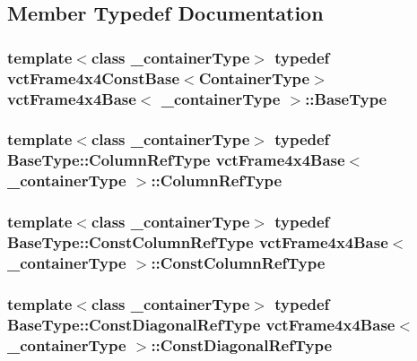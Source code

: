 \subsection{Member Typedef Documentation}
\hypertarget{classvct_frame4x4_base_afdce5a53de5e8e244a2e05b4843226bb}{
\subsubsection[{Base\-Type}]{\setlength{\rightskip}{0pt plus 5cm}template$<$class \-\_\-container\-Type$>$ typedef {\bf vct\-Frame4x4\-Const\-Base}$<${\bf Container\-Type}$>$ {\bf vct\-Frame4x4\-Base}$<$ \-\_\-container\-Type $>$\-::{\bf Base\-Type}}}\label{classvct_frame4x4_base_afdce5a53de5e8e244a2e05b4843226bb}
\hypertarget{classvct_frame4x4_base_a5c1b952e27a3cafa0cc196c2a36c33e7}{
\subsubsection[{Column\-Ref\-Type}]{\setlength{\rightskip}{0pt plus 5cm}template$<$class \-\_\-container\-Type$>$ typedef {\bf Base\-Type\-::\-Column\-Ref\-Type} {\bf vct\-Frame4x4\-Base}$<$ \-\_\-container\-Type $>$\-::{\bf Column\-Ref\-Type}}}\label{classvct_frame4x4_base_a5c1b952e27a3cafa0cc196c2a36c33e7}
\hypertarget{classvct_frame4x4_base_a3942845e934c9ac1ede2d499f92a760b}{
\subsubsection[{Const\-Column\-Ref\-Type}]{\setlength{\rightskip}{0pt plus 5cm}template$<$class \-\_\-container\-Type$>$ typedef {\bf Base\-Type\-::\-Const\-Column\-Ref\-Type} {\bf vct\-Frame4x4\-Base}$<$ \-\_\-container\-Type $>$\-::{\bf Const\-Column\-Ref\-Type}}}\label{classvct_frame4x4_base_a3942845e934c9ac1ede2d499f92a760b}
\hypertarget{classvct_frame4x4_base_ae8ff29e1d404cc75dd2163bf99446d90}{
\subsubsection[{Const\-Diagonal\-Ref\-Type}]{\setlength{\rightskip}{0pt plus 5cm}template$<$class \-\_\-container\-Type$>$ typedef {\bf Base\-Type\-::\-Const\-Diagonal\-Ref\-Type} {\bf vct\-Frame4x4\-Base}$<$ \-\_\-container\-Type $>$\-::{\bf Const\-Diagonal\-Ref\-Type}}}\label{classvct_frame4x4_base_ae8ff29e1d404cc75dd2163bf99446d90}
